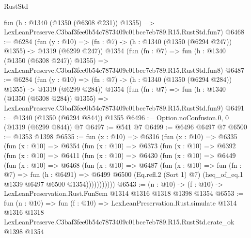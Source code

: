 \begin{lexlean}{RustStd}
\begin{coremodule}
    fun (h : @1340 (@1350 (@6308 @231)) @1355) =>
    LexLeanPreserve.C3baf3fee0b54c7873409c01bce7eb789.R15.RustStd.fun7)
@6468 := @6284
    (fun (y : @10) => (fn : @7) -> (h : @1340 (@1350 (@6294 @247)) @1355) -> @1319 (@6299 @247))
    @1354
    (fun (fn : @7) =>
    fun (h : @1340 (@1350 (@6308 @247)) @1355) =>
    LexLeanPreserve.C3baf3fee0b54c7873409c01bce7eb789.R15.RustStd.fun8)
@6487 := @6284
    (fun (y : @10) => (fn : @7) -> (h : @1340 (@1350 (@6294 @284)) @1355) -> @1319 (@6299 @284))
    @1354
    (fun (fn : @7) =>
    fun (h : @1340 (@1350 (@6308 @284)) @1355) =>
    LexLeanPreserve.C3baf3fee0b54c7873409c01bce7eb789.R15.RustStd.fun9)
@6491 := @1340 (@1350 (@6294 @844)) @1355
@6496 := Option.noConfusion.{0, 0} (@1319 (@6299 @844)) @7
@6497 := @541 @7
@6499 := @6496 @6497 @7
@6500 := @1353 @1398
@6535 := fun (x : @10) =>
  @6316
    (fun (x : @10) =>
    @6335
      (fun (x : @10) =>
      @6354
        (fun (x : @10) =>
        @6373
          (fun (x : @10) =>
          @6392
            (fun (x : @10) =>
            @6411
              (fun (x : @10) =>
              @6430
                (fun (x : @10) =>
                @6449
                  (fun (x : @10) =>
                  @6468
                    (fun (x : @10) =>
                    @6487
                      (fun (x : @10) =>
                      fun (fn : @7) =>
                      fun (h : @6491) =>
                      @6499
                        @6500
                        (Eq.refl.{2} (Sort 1) @7)
                        (heq_of_eq.{1} @1339 @6497 @6500 @1354)))))))))))
@6543 := (n : @10) -> (f : @10) -> LexLeanPreservation.Rust.FunSem @1314 @1316 @1318 @1398 @1354
@6553 := fun (n : @10) =>
  fun (f : @10) =>
  LexLeanPreservation.Rust.simulate
    @1314
    @1316
    @1318
    LexLeanPreserve.C3baf3fee0b54c7873409c01bce7eb789.R15.RustStd.crate_ok
    @1398
    @1354
\end{coremodule}
\end{lexlean}
